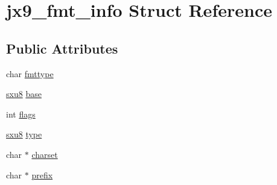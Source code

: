 \hypertarget{structjx9__fmt__info}{\section{jx9\-\_\-fmt\-\_\-info Struct Reference}
\label{d2/da5/structjx9__fmt__info}
}
\subsection*{Public Attributes}
\begin{DoxyCompactItemize}
\item 
char \hyperlink{structjx9__fmt__info_a6ac1954686f804b313d2face6ac7571d}{fmttype}
\item 
\hyperlink{unqlite_8c_ad603950fcd99613e8ef4887422cde7a0}{sxu8} \hyperlink{structjx9__fmt__info_a9207082aac5e981e5875b26e896e0e16}{base}
\item 
int \hyperlink{structjx9__fmt__info_a2aa747213f64c62d2c7edb7723be1272}{flags}
\item 
\hyperlink{unqlite_8c_ad603950fcd99613e8ef4887422cde7a0}{sxu8} \hyperlink{structjx9__fmt__info_a58c2539137a7cc1445a733026f0603f2}{type}
\item 
char $\ast$ \hyperlink{structjx9__fmt__info_a7e23a34d89e8571ceb12b53b70a825bb}{charset}
\item 
char $\ast$ \hyperlink{structjx9__fmt__info_ad67c45c02641db801d0695330cc254f1}{prefix}
\end{DoxyCompactItemize}


